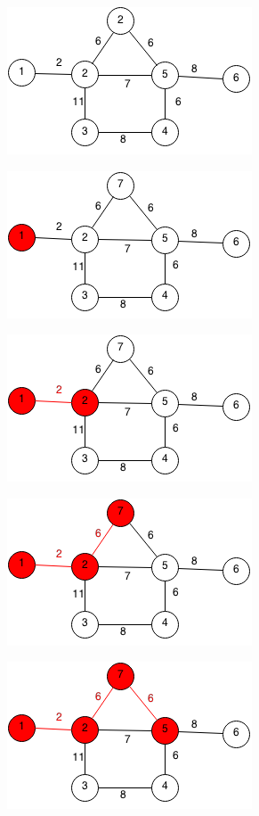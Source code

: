 \documentclass[11pt,oneside]{book}
\makeatletter
\def\maxwidth#1{\ifdim\Gin@nat@width>#1 #1\else\Gin@nat@width\fi}
\makeatother
\begin{document}
\includegraphics[width=\maxwidth{\textwidth}]{prim.png}

\includegraphics[width=\maxwidth{\textwidth}]{prim1.png}

\includegraphics[width=\maxwidth{\textwidth}]{prim2.png}

\includegraphics[width=\maxwidth{\textwidth}]{prim3.png}

\includegraphics[width=\maxwidth{\textwidth}]{prim4.png}
\end{document}
